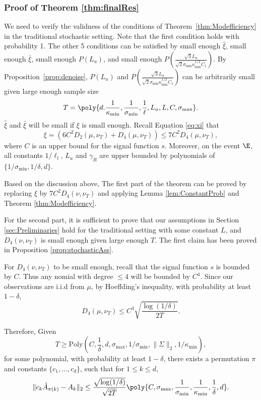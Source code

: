 \subsubsection{Proof of Theorem \ref{thm:finalRes}}
We need to verify the validness of the conditions of Theorem~\ref{thm:Modefficiency} in the traditional stochastic setting. 
Note that the first condition holds with probability 1. 
The other 5 conditions can be satisfied by small enough 
$\hat{\xi}$, small enough $\bar{\xi}$, small enough $P(L_u)$, and small enough $P\left(\frac{\sqrt{3}L_u}{\sqrt{2}\sigma_{\min}\kappa_{\min}^{1/2}C_1}\right)$.
By Proposition~\ref{prop:denoise}, $P(L_u)$ and $P\left(\frac{\sqrt{3}L_u}{\sqrt{2}\sigma_{\min}\kappa_{\min}^{1/2}C_1}\right)$ can be arbitrarily small given large enough sample size 
\[T = \poly{d.\frac{1}{\kappa_{\min}}, \frac{1}{\sigma_{\min}}, \frac{1}{\ell}, L_u, L, C, \sigma_{\max}}.\] 
$\hat{\xi}$ and $\bar{\xi}$ will be small if $\xi$ is small enough.
Recall Equation \eqref{eq:xi} that 
\[\xi = \left( 6C^2D_2(\mu, \nu_T) + D_4(\mu, \nu_T)\right) \le 7C^2D_4(\mu, \nu_T),\]
where $C$ is an upper bound for the signal function $s$.
Moreover, on the event $\E$, all constants $1/\ell_l$, $L_u$ and $\gamma_R$ are upper bounded by polynomials of $\{ 1/\sigma_{\min}, 1/\delta, d\}$. 

Based on the discussion above, The first part of the theorem can be proved by replacing $\xi$ by $7C^2D_4(\nu,\nu_T)$ and applying Lemma \ref{lem:ConstantProb} and Theorem \ref{thm:Modefficiency}. 

For the second part, it is sufficient to prove that our assumptions in Section \ref{sec:Preliminaries} hold for the traditional setting with some constant $L$, and $D_4(\nu, \nu_T)$ is small enough given large enough $T$.
The first claim has been proved in Proposition \ref{prop:stochasticAss}. 

For $D_4(\nu, \nu_T)$ to be small enough, recall that the signal function $s$ is bounded by $C$. 
Thus any nomial with degree $\le 4$ will be bounded by $C^4$. Since our observations are i.i.d from $\mu$, by Hoeffding's inequality, with probability at least $1-\delta$, 
\[
D_4(\mu, \nu_T) \le  C^4\sqrt{\frac{\log(1/\delta)}{2T}}.
\]

Therefore, Given 
\[
T \ge \text{Poly}\left(C, \frac{1}{\delta}, d,  \sigma_{\max}, 1/\sigma_{\min}, \|\Sigma\|_2, 1/\kappa_{\min}\right),
\]
for some polynomial, with probability at least $1-\delta$, there exists a permutation $\pi$ and constants $\{c_1,\ldots,c_d\}$, such that for $1\le k\le d$,
\[
\| c_k\hat{A}_{\pi(k)} - A_k\|_2 \le \frac{\sqrt{\log(1/\delta)}}{\sqrt{2T}}\poly{C, \sigma_{\max}, \frac{1}{\sigma_{\min}}, \frac{1}{\kappa_{\min}},\frac{1}{\delta}, d}.
\]


